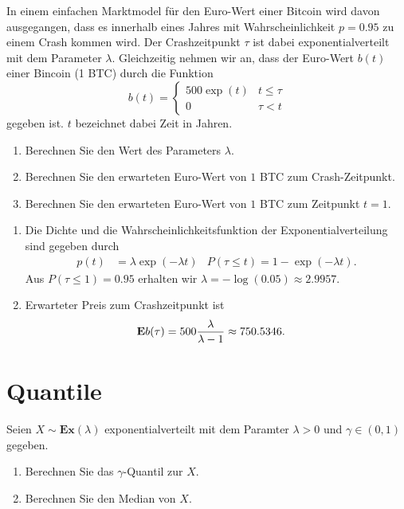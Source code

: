  In einem einfachen Marktmodel für
den Euro-Wert einer Bitcoin wird davon ausgegangen, dass es innerhalb eines
Jahres mit Wahrscheinlichkeit $p=0.95$ zu einem Crash kommen wird. Der
Crashzeitpunkt $\tau$ ist dabei exponentialverteilt mit dem Parameter
$\lambda$. Gleichzeitig nehmen wir an, dass der Euro-Wert $b(t)$ einer Bincoin
(1 BTC) durch die Funktion
\begin{equation*}
    b(t) =
    \begin{cases}
        500 \exp( t ) & t \leq \tau \\
        0 & \tau < t
    \end{cases}
\end{equation*}
gegeben ist. $t$ bezeichnet dabei Zeit in Jahren. 
\begin{enumerate}
    \item Berechnen Sie den Wert des Parameters $\lambda$.
    \item Berechnen Sie den erwarteten Euro-Wert von $1$ BTC zum Crash-Zeitpunkt.
    \item Berechnen Sie den erwarteten Euro-Wert von $1$ BTC zum Zeitpunkt $t=1$. 
\end{enumerate}

\solution
\begin{enumerate}
    \item Die Dichte und die Wahrscheinlichkeitsfunktion der Exponentialverteilung sind gegeben 
        durch
        \begin{align*}
            p(t) &= \lambda \exp\left( -\lambda t \right) & P(\tau \leq t) = 1- \exp( - \lambda t). 
        \end{align*}
        Aus $P( \tau \leq 1 ) = 0.95$ erhalten wir $\lambda = - \log\left( 0.05 \right) \approx 2.9957$.
    \item Erwarteter Preis zum Crashzeitpunkt ist 
        \begin{align*}
            \mathbf{E} b(\tau) &= 500 \frac{\lambda}{\lambda-1} \approx 750.5346.
        \end{align*}
\end{enumerate}



\section{Quantile}

 Seien 
$X\sim \mathbf{Ex}(\lambda)$ exponentialverteilt mit dem Paramter $\lambda>0$
und $\gamma\in (0,1)$ gegeben. 
\begin{enumerate}
    \item Berechnen Sie das $\gamma$-Quantil zur $X$. 
    \item Berechnen Sie den Median von $X$. 
\end{enumerate}

